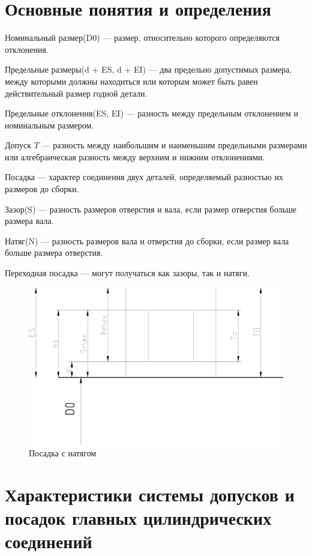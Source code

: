 \section{Основные понятия и определения}

Номинальный размер(D0) --- размер, относительно которого определяются отклонения.

Предельные размеры(d + ES, d + EI) --- два предельно допустимых размера, между которыми должны находиться или которым может быть равен действительный размер годной детали.

Предельные отклонения(ES, EI) --- разность между предельным отклонением и номинальным размером.

Допуск $T$ --- разность между наибольшим и наименьшим предельными размерами или алгебраическая разность между верхним и нижним отклонениями.

Посадка --- характер соединения двух деталей, определяемый разностью их размеров до сборки.

Зазор(S) ---  разность размеров отверстия и вала, если размер отверстия больше размера вала.

Натяг(N) --- разность размеров вала и отверстия до сборки, если размер вала больше размера отверстия.

Переходная посадка --- могут получаться как зазоры, так и натяги.

\begin{figure}
	\centering
	\includegraphics[width=0.7\linewidth]{pic/1_1}
	\caption{Посадка с натягом}
	\label{fig:11}
\end{figure}


\section{Характеристики системы допусков и посадок главных цилиндрических соединений}

